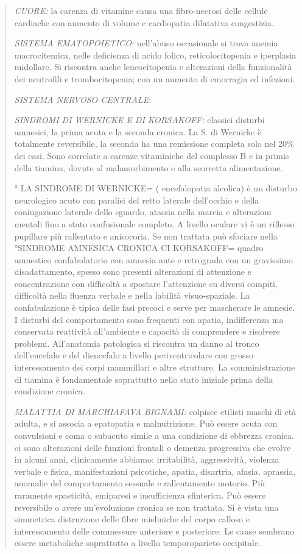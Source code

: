 \documentclass[]{article}
\begin{document}
\begin{quote}
\emph{CUORE:} la carenza di vitamine causa una fibro-necrosi delle
cellule cardiache con aumento di volume e cardiopatia dilatativa
congestizia.

\emph{SISTEMA EMATOPOIETICO:} nell'abuso occasionale si trova anemia
macrocitemica, nelle deficienza di acido folico, reticolocitopenia e
iperplasia midollare. Si riscontra anche leucocitopenia e alterazioni
della funzionalità dei neutrofili e trombocitopenia; con un aumento di
emorragia ed infezioni.

\emph{SISTEMA NERVOSO CENTRALE}:

\emph{SINDROMI DI WERNICKE E DI KORSAKOFF:} classici disturbi amnesici,
la prima acuta e la seconda cronica. La S. di Wernicke è totalmente
reversibile, la seconda ha una remissione completa solo nel 20\% dei
casi. Sono correlate a carenze vitaminiche del complesso B e in primis
della tiamina, dovute al malassorbimento e alla scorretta alimentazione.

° LA SINDROME DI WERNICKE= ( encefalopatia alcolica) è un disturbo
neurologico acuto con paralisi del retto laterale dell'occhio e della
coniugazione laterale dello sguardo, atassia nella marcia e alterazioni
mentali fino a stato confusionale completo. A livello oculare vi è un
riflesso pupillare più rallentato e anisocoria. Se non trattata può
sfociare nella °SINDROME AMNESICA CRONICA CI KORSAKOFF= quadro amnestico
confabulatorio con amnesia ante e retrograda con un gravissimo
disadattamento, spesso sono presenti alterazioni di attenzione e
concentrazione con difficoltà a spostare l'attenzione su diversi
compiti, difficoltà nella fluenza verbale e nella labilità
visuo-spaziale. La confabulazione è tipica delle fasi precoci e serve
per mascherare le amnesie. I disturbi del comportamento sono frequenti
con apatia, indifferenza ma conservata reattività all'ambiente e
capacità di comprendere e risolvere problemi. All'anatomia patologica si
riscontra un danno al tronco dell'encefalo e del diencefalo a livello
periventricolare con grosso interessamento dei corpi mammillari e altre
strutture. La somministrazione di tiamina è fondamentale soprattutto
nello stato iniziale prima della condizione cronica.

\emph{MALATTIA DI MARCHIAFAVA BIGNAMI:} colpisce etilisti maschi di età
adulta, e si associa a epatopatia e malnutrizione. Può essere acuta con
convulsioni e coma o subacuto simile a una condizione di ebbrezza
cronica. ci sono alterazioni delle funzioni frontali o demenza
progressiva che evolve in alcuni anni, clinicamente abbiamo:
irritabilità, aggressività, violenza verbale e fisica, manifestazioni
psicotiche, apatia, disartria, afasia, aprassia, anomalie del
comportamento sessuale e rallentamento motorio. Più raramente
spasticità, emiparesi e insufficienza sfinterica. Può essere reversibile
o avere un'evoluzione cronica se non trattata. Si è vista una simmetrica
distruzione delle fibre mieliniche del corpo calloso e interessamento
delle commessure anteriore e posteriore. Le cause sembrano essere
metaboliche soprattutto a livello temporoparieto occipitale.


\end{quote}
\end{document}
